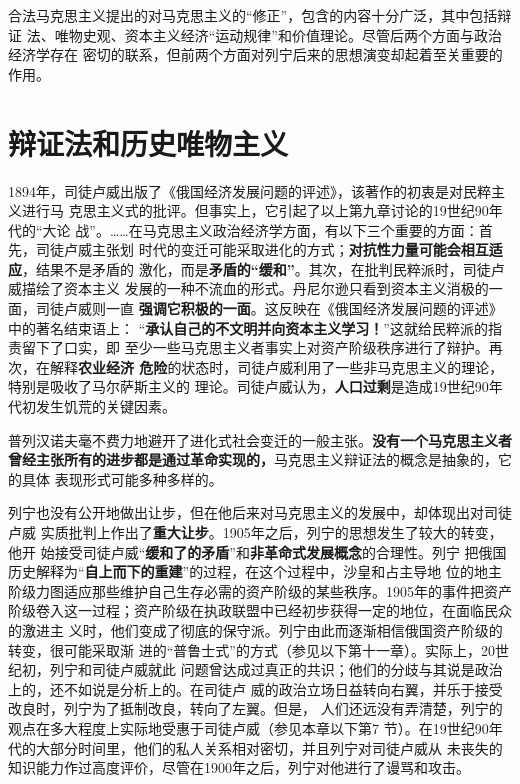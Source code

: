 合法马克思主义提出的对马克思主义的“修正”，包含的内容十分广泛，其中包括辩证
法、唯物史观、资本主义经济“运动规律”和价值理论。尽管后两个方面与政治经济学存在
密切的联系，但前两个方面对列宁后来的思想演变却起着至关重要的作用。

\section{辩证法和历史唯物主义}

1894年，司徒卢威出版了《俄国经济发展问题的评述》，该著作的初衷是对民粹主义进行马
克思主义式的批评。但事实上，它引起了以上第九章讨论的19世纪90年代的“大论
战”。……在马克思主义政治经济学方面，有以下三个重要的方面：首先，司徒卢威主张划
时代的变迁可能采取进化的方式；\textbf{对抗性力量可能会相互适应}，结果不是矛盾的
激化，而是\textbf{矛盾的“缓和”}。其次，在批判民粹派时，司徒卢威描绘了资本主义
发展的一种不流血的形式。丹尼尔逊只看到资本主义消极的一面，司徒卢威则一直
\textbf{强调它积极的一面}。这反映在《俄国经济发展问题的评述》中的著名结束语上：
“\textbf{承认自己的不文明并向资本主义学习！}”这就给民粹派的指责留下了口实，即
至少一些马克思主义者事实上对资产阶级秩序进行了辩护。再次，在解释\textbf{农业经济
危险}的状态时，司徒卢威利用了一些非马克思主义的理论，特别是吸收了马尔萨斯主义的
理论。司徒卢威认为，\textbf{人口过剩}是造成19世纪90年代初发生饥荒的关键因素。

普列汉诺夫毫不费力地避开了进化式社会变迁的一般主张。\textbf{没有一个马克思主义者
曾经主张所有的进步都是通过革命实现的，}马克思主义辩证法的概念是抽象的，它的具体
表现形式可能多种多样的。

列宁也没有公开地做出让步，但在他后来对马克思主义的发展中，却体现出对司徒卢威
实质批判上作出了\textbf{重大让步}。1905年之后，列宁的思想发生了较大的转变，他开
始接受司徒卢威“\textbf{缓和了的矛盾}”和\textbf{非革命式发展概念}的合理性。列宁
把俄国历史解释为“\textbf{自上而下的重建}”的过程，在这个过程中，沙皇和占主导地
位的地主阶级力图适应那些维护自己生存必需的资产阶级的某些秩序。1905年的事件把资产
阶级卷入这一过程；资产阶级在执政联盟中已经初步获得一定的地位，在面临民众的激进主
义时，他们变成了彻底的保守派。列宁由此而逐渐相信俄国资产阶级的转变，很可能采取渐
进的“普鲁士式”的方式（参见以下第十一章）。实际上，20世纪初，列宁和司徒卢威就此
问题曾达成过真正的共识；他们的分歧与其说是政治上的，还不如说是分析上的。在司徒卢
威的政治立场日益转向右翼，并乐于接受改良时，列宁为了抵制改良，转向了左翼。但是，
人们还远没有弄清楚，列宁的观点在多大程度上实际地受惠于司徒卢威（参见本章以下第7
节）。在19世纪90年代的大部分时间里，他们的私人关系相对密切，并且列宁对司徒卢威从
未丧失的知识能力作过高度评价，尽管在1900年之后，列宁对他进行了谩骂和攻击。

